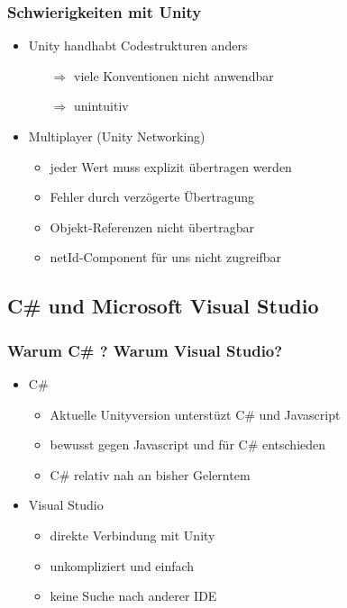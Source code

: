 \documentclass[compress]{beamer}
\begin{document}
\begin{frame}
	\frametitle{Schwierigkeiten mit Unity}

	\begin{itemize}
		\item Unity handhabt Codestrukturen anders
		\begin{itemize}
			\item[$\Rightarrow$] viele Konventionen nicht anwendbar
			\item[$\Rightarrow$] unintuitiv
		\end{itemize}
		\item Multiplayer (Unity Networking)
		\begin{itemize}
			\item jeder Wert muss explizit übertragen werden
			\item Fehler durch verzögerte Übertragung
			\item Objekt-Referenzen nicht übertragbar
			\item netId-Component für uns nicht zugreifbar
		\end{itemize}
	\end{itemize}
\end{frame}

\subsection{C\# und Microsoft Visual Studio}

\begin{frame}
	\frametitle{Warum C\# ? Warum Visual Studio?}

	\begin{itemize}
		\item C\#
		\begin{itemize}
			\item Aktuelle Unityversion unterstüzt C\# und Javascript
			\item bewusst gegen Javascript und für C\# entschieden
			\item C\# relativ nah an bisher Gelerntem
		\end{itemize}
		
		\item Visual Studio
		\begin{itemize}
			\item direkte Verbindung mit Unity
			\item unkompliziert und einfach
			\item keine Suche nach anderer IDE
		\end{itemize}
	\end{itemize}
\end{frame}
\end{document}
